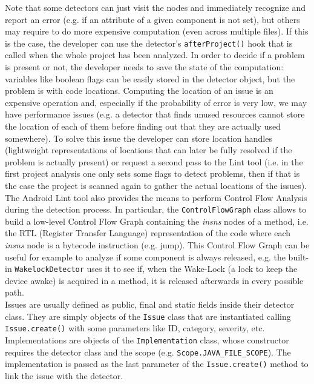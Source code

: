 \documentclass[11pt,a4paper,notitlepage]{article}
\begin{document}
Note that some detectors can just visit the nodes and immediately recognize and report an error (e.g. if an attribute of a given component is not set), but others may require to do more expensive computation (even across multiple files). If this is the case, the developer can use the detector's \texttt{afterProject()} hook that is called when the whole project has been analyzed. In order to decide if a problem is present or not, the developer needs to save the state of the computation: variables like boolean flags can be easily stored in the detector object, but the problem is with code locations. Computing the location of an issue is an expensive operation and, especially if the probability of error is very low, we may have performance issues (e.g. a detector that finds unused resources cannot store the location of each of them before finding out that they are actually used somewhere). To solve this issue the developer can store location handles (lightweight representations of locations that can later be fully resolved if the problem is actually present) or request a second pass to the Lint tool (i.e. in the first project analysis one only sets some flags to detect problems, then if that is the case the project is scanned again to gather the actual locations of the issues).\medskip \\
The Android Lint tool also provides the means to perform Control Flow Analysis during the detection process. In particular, the \texttt{ControlFlowGraph} class allows to build a low-level Control Flow Graph containing the \textit{insns} nodes of a method, i.e. the RTL (Register Transfer Language) representation of the code where each \textit{insns} node is a bytecode instruction (e.g. jump). This Control Flow Graph can be useful for example to analyze if some component is always released, e.g. the built-in \texttt{WakelockDetector} uses it to see if, when the Wake-Lock (a lock to keep the device awake) is acquired in a method, it is released afterwards in every possible path.\bigskip \\
Issues are usually defined as public, final and static fields inside their detector class. They are simply objects of the \texttt{Issue} class that are instantiated calling \texttt{Issue.create()} with some parameters like ID, category, severity, etc.\bigskip \\
Implementations are objects of the \texttt{Implementation} class, whose constructor requires the detector class and the scope (e.g. \texttt{Scope.JAVA\_FILE\_SCOPE}). The implementation is passed as the last parameter of the \texttt{Issue.create()} method to link the issue with the detector.\bigskip \\
\end{document}
